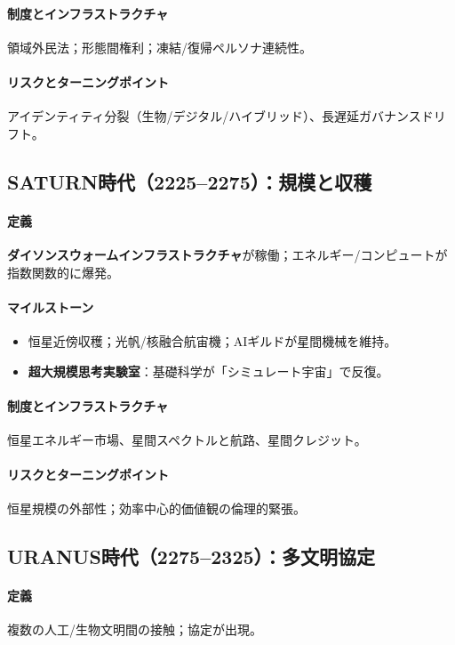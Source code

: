 \documentclass[11pt]{article}
\begin{document}
\paragraph{制度とインフラストラクチャ} 領域外民法；形態間権利；凍結/復帰ペルソナ連続性。

\paragraph{リスクとターニングポイント} アイデンティティ分裂（生物/デジタル/ハイブリッド）、長遅延ガバナンスドリフト。

\subsection{SATURN時代（2225–2275）：規模と収穫}
\paragraph{定義} \textbf{ダイソンスウォームインフラストラクチャ}が稼働；エネルギー/コンピュートが指数関数的に爆発。

\paragraph{マイルストーン}
\begin{itemize}[noitemsep]
  \item 恒星近傍収穫；光帆/核融合航宙機；AIギルドが星間機械を維持。
  \item \textbf{超大規模思考実験室}：基礎科学が「シミュレート宇宙」で反復。
\end{itemize}

\paragraph{制度とインフラストラクチャ} 恒星エネルギー市場、星間スペクトルと航路、星間クレジット。

\paragraph{リスクとターニングポイント} 恒星規模の外部性；効率中心的価値観の倫理的緊張。

\subsection{URANUS時代（2275–2325）：多文明協定}
\paragraph{定義} 複数の人工/生物文明間の接触；協定が出現。
\end{document}
